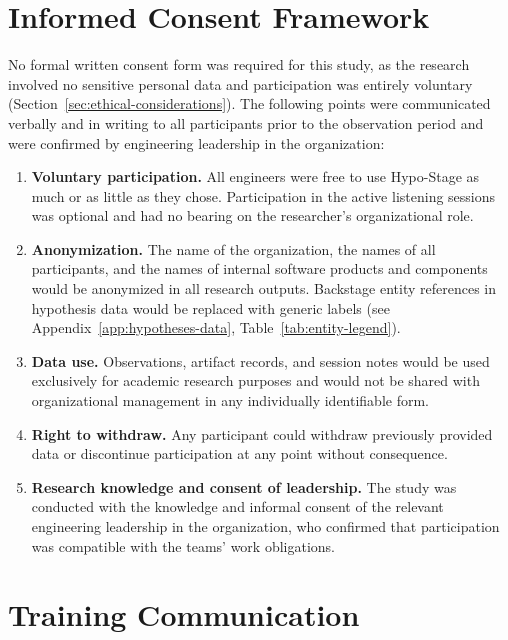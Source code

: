 \section{Informed Consent Framework}
\label{sec:informed-consent}

No formal written consent form was required for this study, as the research
involved no sensitive personal data and participation was entirely voluntary
(Section~\ref{sec:ethical-considerations}). The following points were communicated verbally and in writing
to all participants prior to the observation period and were confirmed by
engineering leadership in the organization:

\begin{enumerate}
  \item \textbf{Voluntary participation.} All engineers were free to use
    Hypo-Stage as much or as little as they chose. Participation in the
    active listening sessions was optional and had no bearing on the
    researcher's organizational role.
  \item \textbf{Anonymization.} The name of the organization, the names of
    all participants, and the names of internal software products and
    components would be anonymized in all research outputs. Backstage entity
    references in hypothesis data would be replaced with generic labels
    (see Appendix~\ref{app:hypotheses-data}, Table~\ref{tab:entity-legend}).
  \item \textbf{Data use.} Observations, artifact records, and session notes
    would be used exclusively for academic research purposes and would not be
    shared with organizational management in any individually identifiable form.
  \item \textbf{Right to withdraw.} Any participant could withdraw previously
    provided data or discontinue participation at any point without consequence.
  \item \textbf{Research knowledge and consent of leadership.} The study
    was conducted with the knowledge and informal consent of the relevant
    engineering leadership in the organization, who confirmed that participation
    was compatible with the teams' work obligations.
\end{enumerate}

\section{Training Communication}
\label{sec:training-comm}
\label{apx:training-communication}

